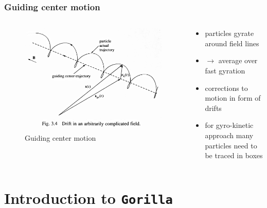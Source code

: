 \documentclass{beamer}
\begin{document}
\begin{frame}
\frametitle{Guiding center motion}
\vspace{-1 cm}
\begin{columns}[onlytextwidth]
	\begin{column}{0.45\textwidth}
		\begin{center}
		\begin{figure}
					\includegraphics[trim={0 2cm 0cm 0cm},clip,width=1.1\textwidth]{FIGURES/guiding_center.jpg}
\caption{Guiding center motion}	
\end{figure}
		\end{center}
	\end{column}
	\begin{column}{0.45\textwidth}
		\begin{center}
			\begin{itemize}
				\item particles gyrate around field lines
				\item $\rightarrow$ average over fast gyration
				\item corrections to motion in form of drifts
				\item for gyro-kinetic approach many particles need to be traced in boxes
			\end{itemize}
		\end{center}
	\end{column}
\end{columns}
\end{frame}


\section{Introduction to \texttt{Gorilla}}
\end{document}
